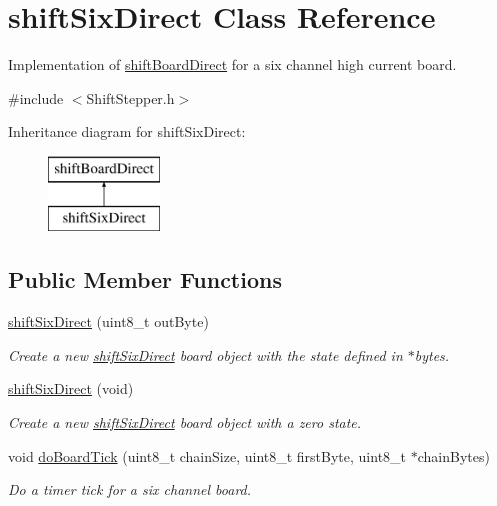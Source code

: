 \hypertarget{classshift_six_direct}{
\section{shiftSixDirect Class Reference}
\label{classshift_six_direct}
}


Implementation of \hyperlink{classshift_board_direct}{shiftBoardDirect} for a six channel high current board.  




{\ttfamily \#include $<$ShiftStepper.h$>$}

Inheritance diagram for shiftSixDirect:\begin{figure}[H]
\begin{center}
\leavevmode
\includegraphics[height=2.000000cm]{classshift_six_direct}
\end{center}
\end{figure}
\subsection*{Public Member Functions}
\begin{DoxyCompactItemize}
\item 
\hyperlink{classshift_six_direct_a02a282b61dcdaf7355701b7a40fecf53}{shiftSixDirect} (uint8\_\-t outByte)
\begin{DoxyCompactList}\small\item\em Create a new \hyperlink{classshift_six_direct}{shiftSixDirect} board object with the state defined in $\ast$bytes. \item\end{DoxyCompactList}\item 
\hyperlink{classshift_six_direct_a960009f3229024ab8de33b0e1a9be374}{shiftSixDirect} (void)
\begin{DoxyCompactList}\small\item\em Create a new \hyperlink{classshift_six_direct}{shiftSixDirect} board object with a zero state. \item\end{DoxyCompactList}\item 
void \hyperlink{classshift_six_direct_a1d0d1896184b4dda12754fd33b902dd8}{doBoardTick} (uint8\_\-t chainSize, uint8\_\-t firstByte, uint8\_\-t $\ast$chainBytes)
\begin{DoxyCompactList}\small\item\em Do a timer tick for a six channel board. \item\end{DoxyCompactList}\end{DoxyCompactItemize}


